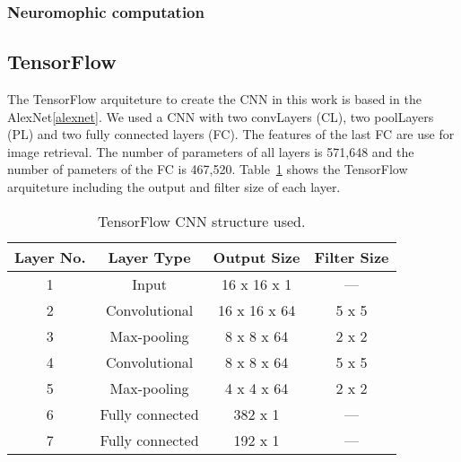 \subsubsection{Neuromophic computation}%

\subsection{TensorFlow} %

The TensorFlow arquiteture to create the CNN in this work is based in the AlexNet\ref{alexnet}.  We used a CNN with two convLayers (CL), two poolLayers (PL) and two fully connected layers (FC). The features of the last FC are use for image retrieval. The number of parameters of all layers is 571,648 and the number of pameters of the FC is 467,520. Table~\ref{tab:layers} shows the TensorFlow arquiteture including the output and filter size of each layer.

\begin{table}
\centering \caption{TensorFlow CNN structure used.} \label{tab:layers}
 \normalsize
     \begin{tabular}{c c c c}
         \hline
         Layer No. & Layer Type      & Output Size & Filter Size \\ \hline
         1         & Input           & 16 x 16 x 1 &  ---\\
         2         & Convolutional   & 16 x 16 x 64 & 5 x 5 \\
         3         & Max-pooling     & 8 x 8 x 64 & 2 x 2 \\
         4         & Convolutional   & 8 x 8 x 64 &  5 x 5 \\
         5         & Max-pooling     & 4 x 4 x 64 &  2 x 2 \\
         6         & Fully connected & 382 x 1 & --- \\
         7         & Fully connected & 192 x 1 & --- \\
         \hline
     \end{tabular}
 \end{table}
